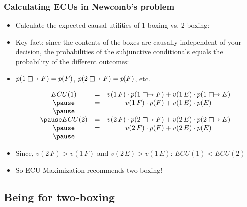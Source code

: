 \begin{frame}
\frametitle{Calculating ECUs in Newcomb's problem}

\begin{itemize}[<+->]

\item Calculate the expected causal utilities of 1-boxing vs. 2-boxing: 

\item Key fact: since the contents of the boxes are causally independent of your decision, the probabilities of the subjunctive conditionals equals the probability of the different outcomes:

\item[] $p(1 \mathrel{\mathop\Box}\mathrel{\mkern-2.5mu}\rightarrow  F) = p(F)$, $p(2 \mathrel{\mathop\Box}\mathrel{\mkern-2.5mu}\rightarrow  F) = p(F)$, etc. 


\[
\begin{array}{ccc}
ECU(1) &= &v(1\, F) \cdot p(1 \must F) + v(1\,E) \cdot p(1 \must E)\\ \pause 
&= &v(1\, F) \cdot p(F) + v(1\,E) \cdot p(E)\\ \pause 
 & & \\ \pause 
ECU(2) &= &v(2\, F) \cdot p(2 \must F) + v(2\,E) \cdot p(2 \must E)\\ \pause 
 &= &v(2\, F) \cdot p(F) + v(2\,E) \cdot p(E)\\ \pause
\end{array}
\]

\item Since, $v(2\, F) > v(1\, F)$ and $v(2\, E) > v(1\, E)$: $ECU(1) < ECU(2)$

\item So ECU Maximization recommends two-boxing!


\end{itemize}
\end{frame}

\subsection{Being for two-boxing}

